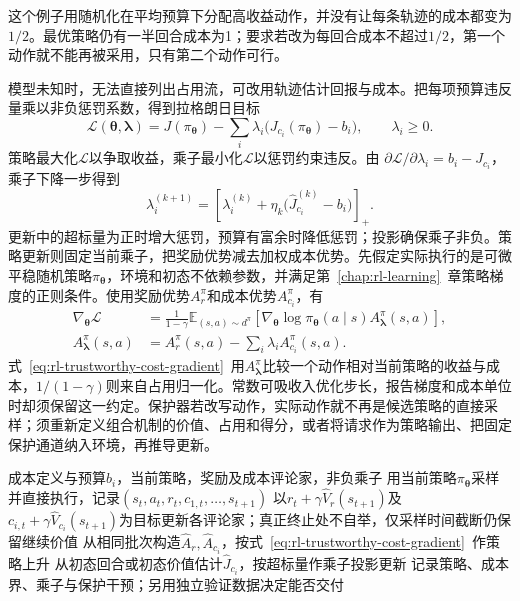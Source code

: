 这个例子用随机化在平均预算下分配高收益动作，并没有让每条轨迹的成本都变为$1/2$。最优策略仍有一半回合成本为1；要求若改为每回合成本不超过$1/2$，第一个动作就不能再被采用，只有第二个动作可行。

模型未知时，无法直接列出占用流，可改用轨迹估计回报与成本。把每项预算违反量乘以非负惩罚系数，得到拉格朗日目标
\begin{equation}
  \mathcal L(\bm{\theta},\bm{\lambda})
    =J(\pi_{\bm{\theta}})
       -\sum_i\lambda_i\bigl(J_{c_i}(\pi_{\bm{\theta}})-b_i\bigr),
  \qquad \lambda_i\geq0.
  \label{eq:rl-trustworthy-lagrangian}
\end{equation}
策略最大化$\mathcal L$以争取收益，乘子最小化$\mathcal L$以惩罚约束违反。由
$\partial\mathcal L/\partial\lambda_i=b_i-J_{c_i}$，乘子下降一步得到
\[
  \lambda_i^{(k+1)}
   =\left[\lambda_i^{(k)}
       +\eta_k\bigl(\widehat J_{c_i}^{(k)}-b_i\bigr)\right]_+.
\]
更新中的超标量为正时增大惩罚，预算有富余时降低惩罚；投影确保乘子非负。策略更新则固定当前乘子，把奖励优势减去加权成本优势。先假定实际执行的是可微平稳随机策略$\pi_{\bm{\theta}}$，环境和初态不依赖参数，并满足第~\ref{chap:rl-learning}~章策略梯度的正则条件。使用奖励优势$A_r^\pi$和成本优势$A_{c_i}^\pi$，有
\begin{equation}
  \begin{aligned}
    \nabla_{\bm{\theta}}\mathcal L
      &=\frac{1}{1-\gamma}
        \mathbb E_{(s,a)\sim d^\pi}
          \left[\nabla_{\bm{\theta}}\log\pi_{\bm{\theta}}(a\mid s)
                 A_{\bm{\lambda}}^\pi(s,a)\right],\\
    A_{\bm{\lambda}}^\pi(s,a)
      &=A_r^\pi(s,a)-\sum_i\lambda_iA_{c_i}^\pi(s,a).
  \end{aligned}
  \label{eq:rl-trustworthy-cost-gradient}
\end{equation}
式~\eqref{eq:rl-trustworthy-cost-gradient}~用$A_{\bm{\lambda}}^\pi$比较一个动作相对当前策略的收益与成本，$1/(1-\gamma)$则来自占用归一化。常数可吸收入优化步长，报告梯度和成本单位时却须保留这一约定。保护器若改写动作，实际动作就不再是候选策略的直接采样；须重新定义组合机制的价值、占用和得分，或者将请求作为策略输出、把固定保护通道纳入环境，再推导更新。

\begin{algorithm}
  \label{alg:rl-trustworthy-primal-dual}
  \begin{algorithmic}[1]
    \Require 成本定义与预算$b_i$，当前策略，奖励及成本评论家，非负乘子
      \State 用当前策略$\pi_{\bm{\theta}}$采样并直接执行，记录$(s_t,a_t,r_t,c_{1,t},\ldots,s_{t+1})$
      \State 以$r_t+\gamma\widehat V_r(s_{t+1})$及$c_{i,t}+\gamma\widehat V_{c_i}(s_{t+1})$为目标更新各评论家；真正终止处不自举，仅采样时间截断仍保留继续价值
      \State 从相同批次构造$\widehat A_r,\widehat A_{c_i}$，按式~\eqref{eq:rl-trustworthy-cost-gradient}~作策略上升
      \State 从初态回合或初态价值估计$\widehat J_{c_i}$，按超标量作乘子投影更新
      \State 记录策略、成本界、乘子与保护干预；另用独立验证数据决定能否交付
    \EndFor
  \end{algorithmic}
\end{algorithm}

